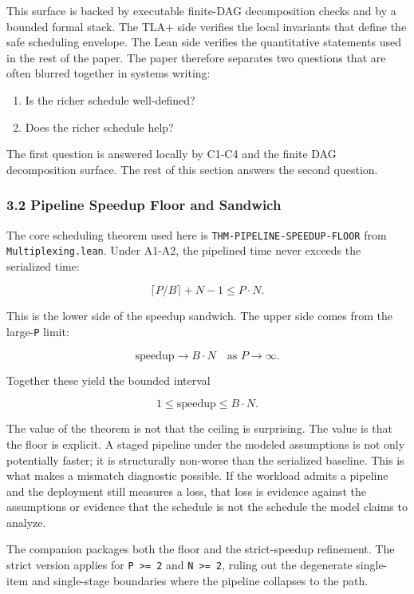 \documentclass[
  11pt,
]{article}
\providecommand{\tightlist}{%
  \setlength{\itemsep}{0pt}\setlength{\parskip}{0pt}}
\begin{document}
This surface is backed by executable finite-DAG decomposition checks and
by a bounded formal stack. The TLA+ side verifies the local invariants
that define the safe scheduling envelope. The Lean side verifies the
quantitative statements used in the rest of the paper. The paper
therefore separates two questions that are often blurred together in
systems writing:

\begin{enumerate}
\def\labelenumi{\arabic{enumi}.}
\tightlist
\item
  Is the richer schedule well-defined?
\item
  Does the richer schedule help?
\end{enumerate}

The first question is answered locally by C1-C4 and the finite DAG
decomposition surface. The rest of this section answers the second
question.

\subsubsection{3.2 Pipeline Speedup Floor and
Sandwich}\label{pipeline-speedup-floor-and-sandwich}

The core scheduling theorem used here is
\texttt{THM-PIPELINE-SPEEDUP-FLOOR} from \texttt{Multiplexing.lean}.
Under A1-A2, the pipelined time never exceeds the serialized time:

\[
\lceil P/B \rceil + N - 1 \le P \cdot N.
\]

This is the lower side of the speedup sandwich. The upper side comes
from the large-\texttt{P} limit:

\[
\mathrm{speedup} \to B \cdot N \quad \text{as } P \to \infty.
\]

Together these yield the bounded interval

\[
1 \le \mathrm{speedup} \le B \cdot N.
\]

The value of the theorem is not that the ceiling is surprising. The
value is that the floor is explicit. A staged pipeline under the modeled
assumptions is not only potentially faster; it is structurally non-worse
than the serialized baseline. This is what makes a mismatch diagnostic
possible. If the workload admits a pipeline and the deployment still
measures a loss, that loss is evidence against the assumptions or
evidence that the schedule is not the schedule the model claims to
analyze.

The companion packages both the floor and the strict-speedup refinement.
The strict version applies for \texttt{P\ \textgreater{}=\ 2} and
\texttt{N\ \textgreater{}=\ 2}, ruling out the degenerate single-item
and single-stage boundaries where the pipeline collapses to the path.
\end{document}
